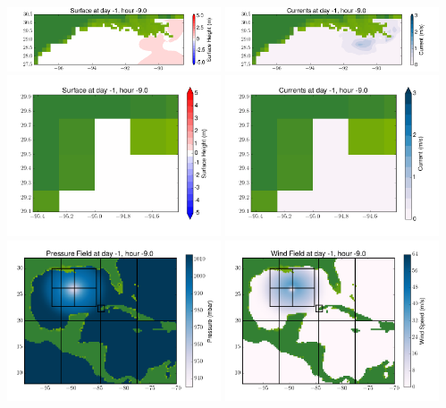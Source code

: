 \documentclass[11pt]{article}
\begin{document}
\includegraphics[width=0.475\textwidth]{frame0039fig4.png}
\vskip 10pt 
\includegraphics[width=0.475\textwidth]{frame0039fig5.png}
\includegraphics[width=0.475\textwidth]{frame0039fig6.png}
\vskip 10pt 
\includegraphics[width=0.475\textwidth]{frame0039fig7.png}
\includegraphics[width=0.475\textwidth]{frame0039fig8.png}
\vskip 10pt 
\includegraphics[width=0.475\textwidth]{frame0039fig9.png}
\end{document}
